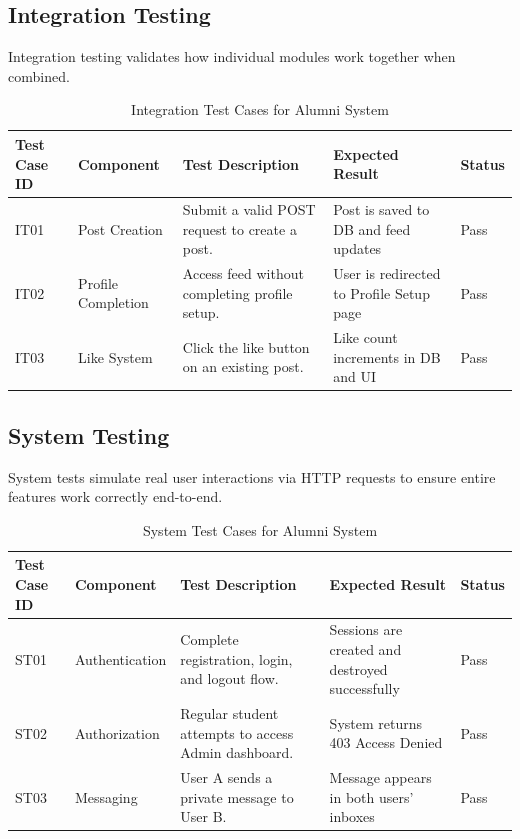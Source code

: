 \subsection{Integration Testing}
Integration testing validates how individual modules work together when combined.

\begin{table}[H]
    \centering
    \small
    \begin{tabular}{|l|l|p{6cm}|p{5cm}|l|}
        \hline
        \textbf{Test Case ID} & \textbf{Component} & \textbf{Test Description} & \textbf{Expected Result} & \textbf{Status} \\
        \hline
        IT01 & Post Creation & Submit a valid POST request to create a post. & Post is saved to DB and feed updates & Pass \\
        \hline
        IT02 & Profile Completion & Access feed without completing profile setup. & User is redirected to Profile Setup page & Pass \\
        \hline
        IT03 & Like System & Click the like button on an existing post. & Like count increments in DB and UI & Pass \\
        \hline
    \end{tabular}
    \caption{Integration Test Cases for Alumni System}
    \label{tab:integration_tests}
\end{table}

\subsection{System Testing}
System tests simulate real user interactions via HTTP requests to ensure entire features work correctly end-to-end.

\begin{table}[H]
    \centering
    \small
    \begin{tabular}{|l|l|p{6cm}|p{5cm}|l|}
        \hline
        \textbf{Test Case ID} & \textbf{Component} & \textbf{Test Description} & \textbf{Expected Result} & \textbf{Status} \\
        \hline
        ST01 & Authentication & Complete registration, login, and logout flow. & Sessions are created and destroyed successfully & Pass \\
        \hline
        ST02 & Authorization & Regular student attempts to access Admin dashboard. & System returns 403 Access Denied & Pass \\
        \hline
        ST03 & Messaging & User A sends a private message to User B. & Message appears in both users' inboxes & Pass \\
        \hline
    \end{tabular}
    \caption{System Test Cases for Alumni System}
    \label{tab:system_tests}
\end{table}

